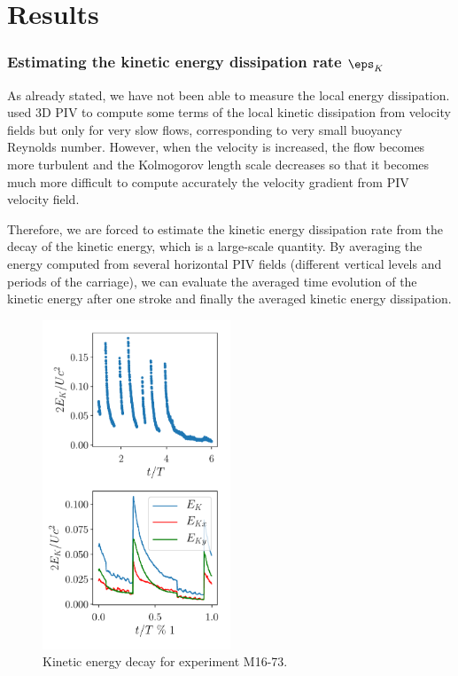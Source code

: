 \section{Results}

\subsubsection{Estimating the kinetic energy dissipation rate $\eps_K$}

As already stated, we have not been able to measure the local energy
dissipation. \cite{PraudFinchamSommeria2005} used 3D PIV to compute some terms
of the local kinetic dissipation from velocity fields but only for very slow
flows, corresponding to very small buoyancy Reynolds number. However, when the
velocity is increased, the flow becomes more turbulent and the Kolmogorov
length scale decreases so that it becomes much more difficult to compute
accurately the velocity gradient from PIV velocity field.

Therefore, we are forced to estimate the kinetic energy dissipation rate from
the decay of the kinetic energy, which is a large-scale quantity. By averaging
the energy computed from several horizontal PIV fields (different vertical
levels and periods of the carriage), we can evaluate the averaged time
evolution of the kinetic energy after one stroke and finally the averaged
kinetic energy dissipation.

\begin{figure}[htp!]
\centering
\includegraphics[width=0.5\textwidth]{tmp/fig_energy_vs_time}

\caption{Kinetic energy decay for experiment M16-73.}%
\label{fig:energy:vs:time}

\end{figure}


